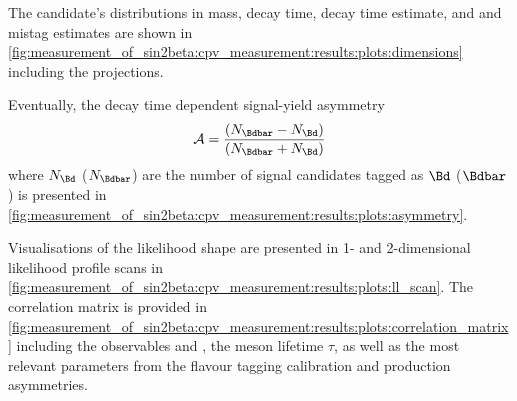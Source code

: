 The \Bmeson candidate's distributions in mass, decay time, decay time estimate, and \OS and
\SSpi mistag estimates are shown in
\cref{fig:measurement_of_sin2beta:cpv_measurement:results:plots:dimensions}
including the \PDF projections. 

Eventually, the decay time dependent signal-yield asymmetry
%
\begin{equation}
  \mathcal{A} = \frac{(N_{\Bdbar} - N_{\Bd})}{(N_{\Bdbar} + N_{\Bd})}
\end{equation}
%
where $N_{\Bd}$ ($N_{\Bdbar}$) are the number of \BdToJpsiKS signal candidates
tagged as $\Bd$ ($\Bdbar$) is presented in
\cref{fig:measurement_of_sin2beta:cpv_measurement:results:plots:asymmetry}.

Visualisations of the likelihood shape are presented in 1- and 2-dimensional
likelihood profile scans in
\cref{fig:measurement_of_sin2beta:cpv_measurement:results:plots:ll_scan}. 
The correlation matrix is provided in 
\cref{fig:measurement_of_sin2beta:cpv_measurement:results:plots:correlation_matrix} 
including the \CP observables \SJpsiKS and \CJpsiKS, the \Bd meson lifetime
$\tau$, as well as the most relevant parameters from the flavour tagging
calibration and production asymmetries.
%
